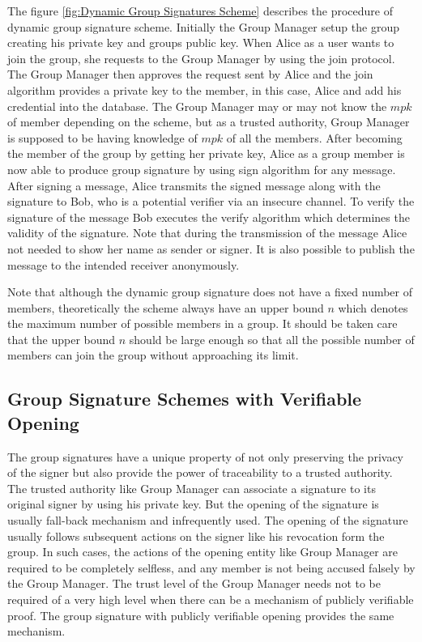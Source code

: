 The figure \ref{fig:Dynamic Group Signatures Scheme} describes the procedure of dynamic group signature scheme. Initially the Group Manager setup the group creating his private key and groups public key. When Alice as a user wants to join the group, she requests to the Group Manager by using the join protocol. The Group Manager then approves the request sent by Alice and the join algorithm provides a private key to the member, in this case, Alice and add his credential into the database. The Group Manager may or may not know the $mpk$ of member depending on the scheme, but as a trusted authority, Group Manager is supposed to be having knowledge of $mpk$ of all the members. After becoming the member of the group by getting her private key, Alice as a group member is now able to produce group signature by using sign algorithm for any message. After signing a message, Alice transmits the signed message along with the signature to Bob, who is a potential verifier via an insecure channel. To verify the signature of the message Bob executes the verify algorithm which determines the validity of the signature. Note that during the transmission of the message Alice not needed to show her name as sender or signer. It is also possible to publish the message to the intended receiver anonymously.

Note that although the dynamic group signature does not have a fixed number of members, theoretically the scheme always have an upper bound $n$ which denotes the maximum number of possible members in a group. It should be taken care that the upper bound $n$ should be large enough so that all the possible number of members can join the group without approaching its limit.
\subsection{Group Signature Schemes with Verifiable Opening}
The group signatures have a unique property of not only preserving the privacy of the signer but also provide the power of traceability to a trusted authority. The trusted authority like Group Manager can associate a signature to its original signer by using his private key. But the opening of the signature is usually fall-back mechanism and infrequently used. The opening of the signature usually follows subsequent actions on the signer like his revocation form the group. In such cases, the actions of the opening entity like Group Manager are required to be completely selfless, and any member is not being accused falsely by the Group Manager. The trust level of the Group Manager needs not to be required of a very high level when there can be a mechanism of publicly verifiable proof. The group signature with publicly verifiable opening provides the same mechanism. 

